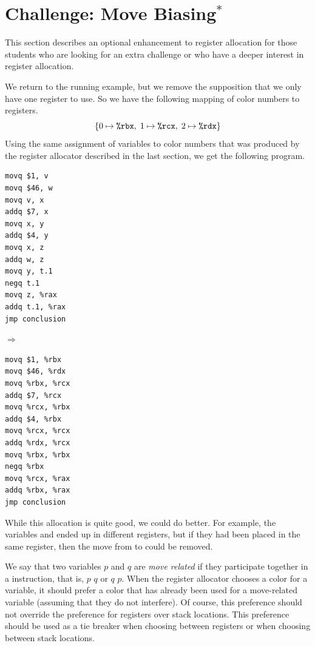 \documentclass[11pt]{book}
\begin{document}
\section{Challenge: Move Biasing$^{*}$}
\label{sec:move-biasing}

This section describes an optional enhancement to register allocation
for those students who are looking for an extra challenge or who have
a deeper interest in register allocation.

We return to the running example, but we remove the supposition that
we only have one register to use. So we have the following mapping of
color numbers to registers.
\[
  \{ 0 \mapsto \texttt{\%rbx}, \; 1 \mapsto \texttt{\%rcx}, \; 2 \mapsto \texttt{\%rdx} \}
\]
Using the same assignment of variables to color numbers that was
produced by the register allocator described in the last section, we
get the following program.

\begin{minipage}{0.3\textwidth}
\begin{lstlisting}
movq $1, v
movq $46, w
movq v, x
addq $7, x
movq x, y
addq $4, y
movq x, z
addq w, z
movq y, t.1
negq t.1
movq z, %rax
addq t.1, %rax
jmp conclusion
\end{lstlisting}
\end{minipage}
$\Rightarrow\qquad$
\begin{minipage}{0.45\textwidth}
\begin{lstlisting}
movq $1, %rbx
movq $46, %rdx
movq %rbx, %rcx
addq $7, %rcx
movq %rcx, %rbx
addq $4, %rbx
movq %rcx, %rcx
addq %rdx, %rcx
movq %rbx, %rbx
negq %rbx
movq %rcx, %rax
addq %rbx, %rax
jmp conclusion
\end{lstlisting}
\end{minipage}

While this allocation is quite good, we could do better. For example,
the variables  and  ended up in different registers, but
if they had been placed in the same register, then the move from
 to  could be removed.

We say that two variables $p$ and $q$ are \emph{move related} if they
participate together in a  instruction, that is, 
$p$\key{,} $q$ or  $q$\key{,} $p$. When the register
allocator chooses a color for a variable, it should prefer a color
that has already been used for a move-related variable (assuming that
they do not interfere). Of course, this preference should not override
the preference for registers over stack locations. This preference
should be used as a tie breaker when choosing between registers or
when choosing between stack locations.
\end{document}
